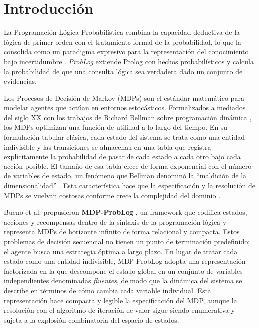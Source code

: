 \section{Introducción}
\label{ch:introduccion}

La Programación Lógica Probabilística combina la capacidad deductiva
de la lógica de primer orden con el tratamiento formal de la
probabilidad, lo que la consolida como un paradigma expresivo para
la representación del conocimiento bajo incertidumbre
\cite{deraedt2007problog}. \textit{ProbLog} extiende Prolog con
hechos probabilísticos y calcula la probabilidad de que una consulta
lógica sea verdadera dado un conjunto de evidencias.
    
Los Procesos de Decisión de Markov (MDPs) son el estándar matemático
para modelar agentes que actúan en entornos estocásticos. Formalizados
a mediados del siglo XX con los trabajos de Richard Bellman sobre
programación dinámica \cite{bellman1957dynamic}, los MDPs optimizan
una función de utilidad a lo largo del tiempo. En su formulación
tabular clásica, cada estado del sistema se trata como una entidad
indivisible y las transiciones se almacenan en una tabla que registra
explícitamente la probabilidad de pasar de cada estado a cada otro
bajo cada acción posible. El tamaño de esa tabla crece de forma
exponencial con el número de variables de estado, un fenómeno que
Bellman denominó la ``maldición de la dimensionalidad''
\cite{bellman1957dynamic}. Esta característica hace que la
especificación y la resolución de MDPs se vuelvan costosas conforme
crece la complejidad del dominio \cite{puterman2014markov}.

Bueno et al. propusieron \textbf{MDP-ProbLog} \cite{bueno2016mdp},
un framework que codifica estados, acciones y recompensas dentro de
la sintaxis de la programación lógica y representa MDPs de horizonte
infinito de forma relacional y compacta. Estos problemas de decisión
secuencial no tienen un punto de terminación predefinido; el agente
busca una estrategia óptima a largo plazo. En lugar de tratar cada
estado como una entidad indivisible, MDP-ProbLog adopta una
representación factorizada en la que descompone el estado global en
un conjunto de variables independientes denominadas \textit{fluentes},
de modo que la dinámica del sistema se describe en términos de cómo
cambia cada variable individual. Esta representación hace compacta y
legible la especificación del MDP, aunque la resolución con el
algoritmo de iteración de valor sigue siendo enumerativa y sujeta a
la explosión combinatoria del espacio de estados.

